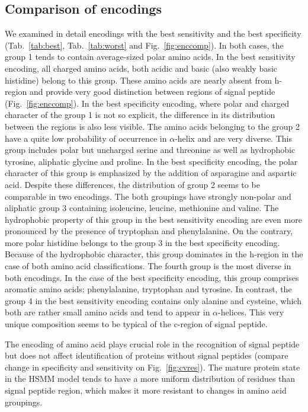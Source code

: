 \documentclass[fleqn,10pt,twoside]{gcb15submission}
\begin{document}
\subsection*{Comparison of encodings}

We examined in detail encodings with the best sensitivity and the best specificity (Tab.~\ref{tab:best}, Tab.~\ref{tab:worst} and Fig.~\ref{fig:enccomp}). In both cases, the group 1 tends to contain average-sized polar amino acids. In the best sensitivity encoding, all charged amino acids, both acidic and basic (also weakly basic histidine)   belong to this group. These amino acids are nearly absent from h-region and provide very good distinction between regions of signal peptide (Fig.~\ref{fig:enccomp}). In the best specificity encoding, where polar and charged character of the group 1 is not so explicit, the difference in its distribution between the regions is also less visible.
The amino acids belonging to the group 2 have a quite low probability of occurrence in $\alpha$-helix and are very diverse. This group includes polar but uncharged serine and threonine as well as hydrophobic tyrosine, aliphatic glycine and proline. In the best specificity encoding, the polar character of this group is emphasized by the addition of asparagine and aspartic acid. Despite these differences, the distribution of group 2 seems to be comparable in two encodings. The both groupings have strongly non-polar and aliphatic group 3 containing isoleucine, leucine, methionine and valine. The hydrophobic property of this group in the best sensitivity encoding are even more pronounced by the presence of tryptophan and phenylalanine. On the contrary, more polar histidine belongs to the group 3 in the best specificity encoding. Because of the hydrophobic character, this group dominates in the h-region in the case of both amino acid classifications.
The fourth group is the most diverse in both encodings. In the case of the best specificity encoding, this group comprises aromatic amino acids: phenylalanine, tryptophan and tyrosine. In contrast, the group 4 in the best sensitivity encoding contains only alanine and cysteine, which both are rather small amino acids and tend to appear in $\alpha$-helices. This very unique composition seems to be typical of the c-region of signal peptide.

The encoding of amino acid plays crucial role in the recognition of signal peptide but does not affect identification of proteins without signal peptides (compare change in specificity and sensitivity on Fig.~\ref{fig:cvres}). The mature protein state in the HSMM model tends to have a more uniform distribution of residues than signal peptide region, which makes it more resistant to changes in amino acid groupings.
\end{document}
